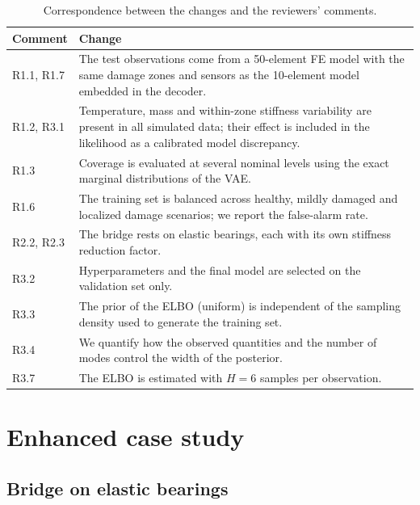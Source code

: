 \documentclass[11pt]{article}
\begin{document}
\begin{table}[H]
\centering\small
\caption{Correspondence between the changes and the reviewers' comments.}
\label{tab:reviewers}
\begin{tabular}{p{2.4cm}p{12cm}}
\toprule
Comment & Change \\
\midrule
R1.1, R1.7 & The test observations come from a 50-element FE model with the same damage zones and sensors as the
10-element model embedded in the decoder. \\
R1.2, R3.1 & Temperature, mass and within-zone stiffness variability are present in all simulated data; their effect
is included in the likelihood as a calibrated model discrepancy. \\
R1.3 & Coverage is evaluated at several nominal levels using the exact marginal distributions of the VAE. \\
R1.6 & The training set is balanced across healthy, mildly damaged and localized damage scenarios; we report the
false-alarm rate. \\
R2.2, R2.3 & The bridge rests on elastic bearings, each with its own stiffness reduction factor. \\
R3.2 & Hyperparameters and the final model are selected on the validation set only. \\
R3.3 & The prior of the ELBO (uniform) is independent of the sampling density used to generate the training set. \\
R3.4 & We quantify how the observed quantities and the number of modes control the width of the posterior. \\
R3.7 & The ELBO is estimated with $H=6$ samples per observation. \\
\bottomrule
\end{tabular}
\end{table}

\section{Enhanced case study}

\subsection{Bridge on elastic bearings}
\end{document}
